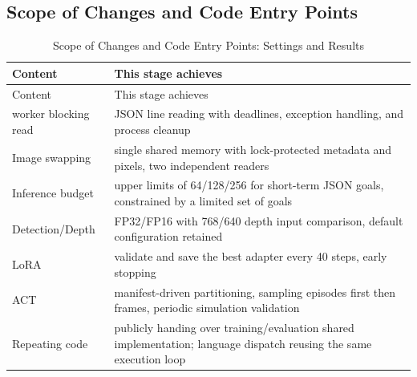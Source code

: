 \subsection{Scope of Changes and Code Entry Points}\label{s18-detail-1}

\FloatBarrier\begingroup\small\setlength{\tabcolsep}{2.5pt}
\begin{longtable}[]{@{}
  >{\raggedright\arraybackslash}p{}
  >{\raggedright\arraybackslash}p{}@{}}
\caption{Scope of Changes and Code Entry Points: Settings and Results}\label{tab:s18-1}\tabularnewline
\toprule\noalign{}
\begin{minipage}[b]{\linewidth}\raggedright
Content
\end{minipage} & \begin{minipage}[b]{\linewidth}\raggedright
This stage achieves
\end{minipage} \\
\midrule\noalign{}
\endfirsthead
\toprule\noalign{}
\begin{minipage}[b]{\linewidth}\raggedright
Content
\end{minipage} & \begin{minipage}[b]{\linewidth}\raggedright
This stage achieves
\end{minipage} \\
\midrule\noalign{}
\endhead
\bottomrule\noalign{}
\endlastfoot
worker blocking read & JSON line reading with deadlines, exception handling, and process cleanup \\
Image swapping & single shared memory with lock-protected metadata and pixels, two independent readers \\
Inference budget & upper limits of 64/128/256 for short-term JSON goals, constrained by a limited set of goals \\
Detection/Depth & FP32/FP16 with 768/640 depth input comparison, default configuration retained \\
LoRA & validate and save the best adapter every 40 steps, early stopping \\
ACT & manifest-driven partitioning, sampling episodes first then frames, periodic simulation validation \\
Repeating code & publicly handing over training/evaluation shared implementation; language dispatch reusing the same execution loop \\
\end{longtable}\endgroup

